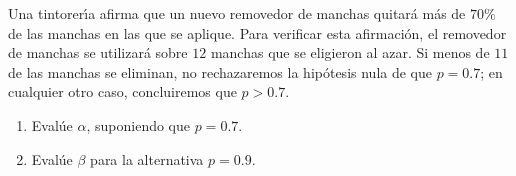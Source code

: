 \begin{enunciado}
 Una tintorer\'{\i}a afirma que un nuevo removedor de manchas quitar\'a m\'as de $70\%$ de las manchas en las que se aplique. Para verificar esta afirmaci\'on, el removedor de manchas se utilizar\'a sobre $12$ manchas que se eligieron al azar. Si menos de $11$ de las manchas se eliminan, no rechazaremos la hip\'otesis nula de que $p = 0.7$; en cualquier otro caso, concluiremos que $p > 0.7$.
 \begin{enumerate}
  \item Eval\'ue $\alpha$, suponiendo que $p = 0.7$.
  
  \item Eval\'ue $\beta$ para la alternativa $p = 0.9$.
 \end{enumerate}
\end{enunciado}

